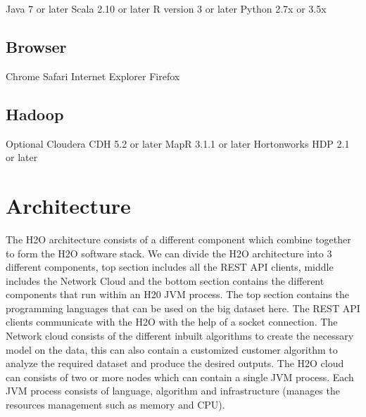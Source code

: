 \documentclass[9pt,twocolumn,twoside]{../../styles/osajnl}
\begin{document}
 Java 7 or later
\newline Scala 2.10 or later
\newline R version 3 or later
\newline Python 2.7x or 3.5x
 
\subsection{Browser}

 Chrome
\newline Safari
\newline Internet Explorer
\newline Firefox

\subsection{Hadoop}
 Optional Cloudera CDH 5.2 or later
\newline MapR 3.1.1 or later
\newline Hortonworks HDP 2.1 or later


\section{Architecture}
\cite{www-h2o-architecture} The H2O architecture consists of a
different component \GE which combine together to form the H2O
software stack. We can divide the H2O architecture into 3 different
components, top section includes all the REST API clients, middle
includes the Network Cloud and the bottom section contains the
different components that run within an H20 JVM process. The top
section contains the programming languages that can be used on the big
dataset here. The REST API clients communicate with the H2O with the
help of a socket connection. The Network cloud consists of the
different inbuilt algorithms to create the necessary model on the
data, this can also contain a customized customer algorithm to analyze
the required dataset and produce the desired outputs.  The H2O cloud
can consists of two or more nodes which can contain a single JVM
process.  Each JVM process consists of
language, algorithm and infrastructure (manages the resources
management such as memory and CPU).
\end{document}
